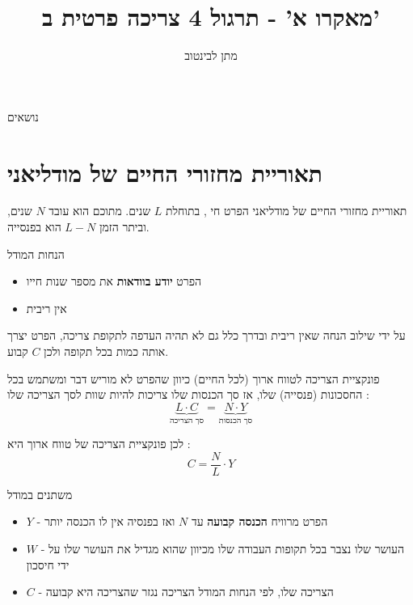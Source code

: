 \documentclass[usenames,dvipsnames]{beamer}
\title[]{{מאקרו א' - תרגול 4 צריכה פרטית ב'}}
\author{\texthebrew{ מתן לבינטוב}}
\institute[{{ אב"ג}}]{{ אוניברסיטת בן גוריון בנגב}}
\date{}
\begin{document}
\begin{RTL}
\begin{frame}
\titlepage
\end{frame}

\begin{frame}{נושאים}
    \tableofcontents
\end{frame}

\section{תאוריית מחזורי החיים של מודליאני}

\begin{frame}[allowframebreaks]{תאוריית מחזורי החיים של מודליאני}
הפרט חי , בתוחלת $L$ שנים. מתוכם הוא עובד $N$ שנים, וביתר הזמן  $L-N$ הוא בפנסייה.
\begin{block}{הנחות המודל}
    \begin{itemize}
        \item הפרט \textbf{יודע בוודאות} את מספר שנות חייו
        \item אין ריבית
    \end{itemize}
    על ידי שילוב הנחה שאין ריבית ובדרך כלל גם לא תהיה העדפה לתקופת צריכה, הפרט יצרך אותה כמות בכל תקופה ולכן $C$ קבוע.
\end{block}

\begin{block}{פונקציית הצריכה לטווח ארוך (לכל החיים)}
    כיוון שהפרט לא מוריש דבר ומשתמש בכל החסכונות (פנסייה) שלו, אז סך הכנסות שלו צריכות להיות שוות לסך הצריכה שלו :
    \begin{equation*}
       \underbrace{ L \cdot C }_{\text{סך הצריכה}}= \underbrace{N \cdot Y }_{\text{סך הכנסות}}
    \end{equation*}    

    לכן פונקציית הצריכה של טווח ארוך היא :
    $$
    C = \frac{N}{L}\cdot Y
    $$
\end{block}
\framebreak %
\begin{block}{משתנים במודל}
\begin{itemize}
    \item $Y$ - הפרט מרוויח \textbf{הכנסה קבועה} עד $N$ ואז בפנסיה אין לו הכנסה יותר
    \item $W$ - העושר שלו נצבר בכל תקופות העבודה שלו מכיוון שהוא מגדיל את העושר שלו על ידי חיסכון
    \item $C$ - הצריכה שלו, לפי הנחות המודל הצריכה נגזר שהצריכה היא קבועה
\end{itemize}
\end{block}
\begin{flushleft}
\end{flushleft}
\end{frame}
\end{RTL}
\end{document}

